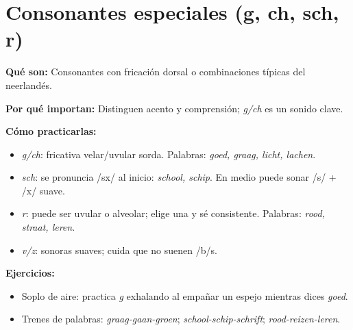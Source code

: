 \section{Consonantes especiales (g, ch, sch, r)}
\textbf{Qué son:} Consonantes con fricación dorsal o combinaciones típicas del neerlandés.

\textbf{Por qué importan:} Distinguen acento y comprensión; \textit{g/ch} es un sonido clave.

\textbf{Cómo practicarlas:}
\begin{itemize}[leftmargin=*]
  \item \textit{g/ch}: fricativa velar/uvular sorda. Palabras: \textit{goed, graag, licht, lachen}.
  \item \textit{sch}: se pronuncia /sx/ al inicio: \textit{school, schip}. En medio puede sonar /s/ + /x/ suave.
  \item \textit{r}: puede ser uvular o alveolar; elige una y sé consistente. Palabras: \textit{rood, straat, leren}.
  \item \textit{v/z}: sonoras suaves; cuida que no suenen /b/s.
\end{itemize}

\textbf{Ejercicios:}
\begin{itemize}[leftmargin=*]
  \item Soplo de aire: practica \textit{g} exhalando al empañar un espejo mientras dices \textit{goed}.
  \item Trenes de palabras: \textit{graag-gaan-groen}; \textit{school-schip-schrift}; \textit{rood-reizen-leren}.
\end{itemize}
